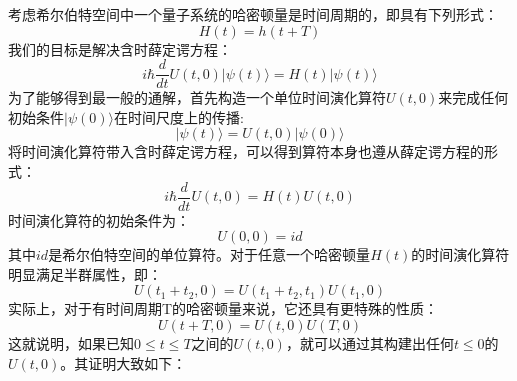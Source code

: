 \documentclass{article}
\begin{document}
	考虑希尔伯特空间中一个量子系统的哈密顿量是时间周期的，即具有下列形式：
	\begin{equation}
		H(t)=h(t + T) \label{eq:19}
	\end{equation}
	我们的目标是解决含时薛定谔方程：
	\begin{equation}
		i\hbar\frac{d}{dt}U(t,0)\vert\psi(t)\rangle=H(t)\vert\psi(t)\rangle \label{eq:20}
	\end{equation}
	为了能够得到最一般的通解，首先构造一个单位时间演化算符$U(t,0)$来完成任何初始条件$\vert\psi(0)\rangle$在时间尺度上的传播:
	\begin{equation}
		\vert\psi(t)\rangle=U(t,0)\vert\psi(0)\rangle \label{eq:21}
	\end{equation}
	将时间演化算符带入含时薛定谔方程，可以得到算符本身也遵从薛定谔方程的形式：
	\begin{equation}
		i\hbar\frac{d}{dt}U(t,0)=H(t)U(t,0) \label{22}
	\end{equation}
	时间演化算符的初始条件为：
	\begin{equation}
		U(0,0) = id
	\end{equation}
	其中$id$是希尔伯特空间的单位算符。对于任意一个哈密顿量$H(t)$的时间演化算符明显满足半群属性，即：
	\begin{equation}
		U(t_1+t_2,0)=U(t_1+t_2,t_1 )U(t_1,0)
	\end{equation}
	实际上，对于有时间周期T的哈密顿量来说，它还具有更特殊的性质：
	\begin{equation}
		U(t+T,0)=U(t,0)U(T,0)
	\end{equation}
	这就说明，如果已知$0\le t\le T$之间的$U(t,0)$，就可以通过其构建出任何$t\le0$的$U(t,0)$。其证明大致如下：
	
\end{document}
